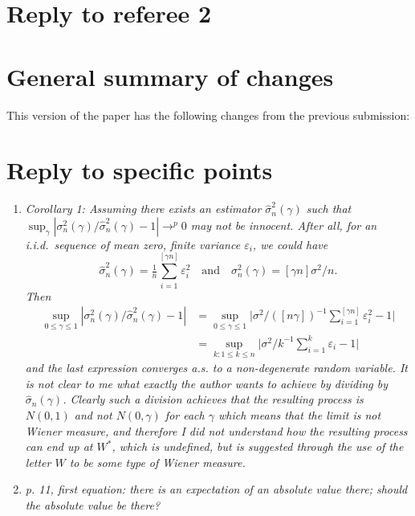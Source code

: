 \documentclass[12pt]{article}
\begin{document}
\section*{\hfill Reply to referee 2\hfill}

\section*{General summary of changes}
This version of the paper has the following changes from the
previous submission:


\section*{Reply to specific points}

\begin{enumerate}
\item \textit{Corollary 1: Assuming there exists an estimator
$\hat{\sigma}_n^2(\gamma)$ such that $\sup_{\gamma}
|\sigma_n^2(\gamma)/\hat{\sigma}_n^2(\gamma) - 1| \to^p 0$ may not be
innocent. After all, for an i.i.d.\ sequence of mean zero, finite
variance $\varepsilon_i$, we could have
\[
\hat{\sigma}_{n}^2(\gamma) = \tfrac{1}{n} \sum_{i=1}^{[\gamma n]} \varepsilon_i^2
\quad\text{and}\quad
\sigma_n^2(\gamma) = [\gamma n] \sigma^2 / n.
\]
Then
\begin{align*}
\sup_{0 \leq \gamma \leq 1} | \sigma_n^2(\gamma) / \hat{\sigma}_n^2(\gamma) - 1 |
& = \sup_{0 \leq \gamma \leq 1} \Big| \sigma^2 \Big/ ([n\gamma])^{-1} \sum_{i=1}^{[\gamma n]} \varepsilon_i^2 - 1 \Big| \\
& = \sup_{k:1 \leq k \leq n} \Big| \sigma^2 \Big/ k^{-1} \sum_{i=1}^{k} \varepsilon_i - 1 \Big|
\end{align*}
and the last expression converges a.s. to a non-degenerate random
variable. It is not clear to me what exactly the author wants to
achieve by dividing by $\hat{\sigma}_n(\gamma)$. Clearly such a
division achieves that the resulting process is $N(0,1)$ and not
$N(0,\gamma)$ for each $\gamma$ which means that the limit is not
Wiener measure, and therefore I did not understand how the resulting
process can end up at $W^{*}$, which is undefined, but is suggested
through the use of the letter $W$ to be some type of Wiener measure.}

\item \textit{p. 11, first equation: there is an expectation of an
    absolute value there; should the absolute value be there?}


\end{enumerate}
\end{document}
